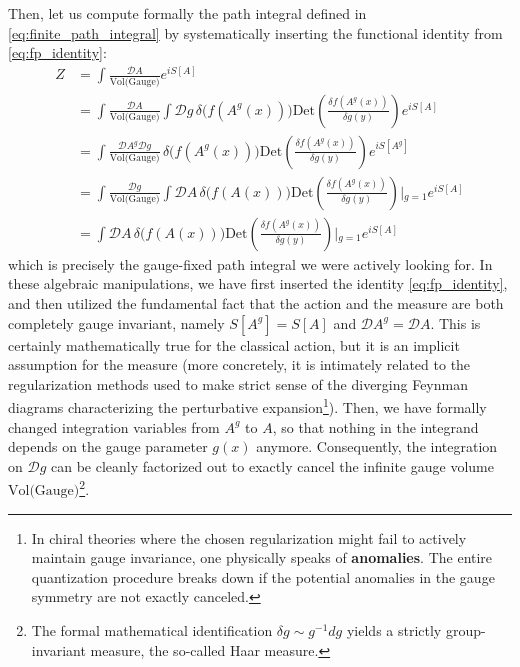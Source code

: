 Then, let us compute formally the path integral defined in \eqref{eq:finite_path_integral} by systematically inserting the functional identity from \eqref{eq:fp_identity}:
\[
    \begin{aligned}
        Z & = \int \frac{\mathcal{D}A}{\text{Vol(Gauge)}} e^{iS[A]} \\ &= \int \frac{\mathcal{D}A}{\text{Vol(Gauge)}} \int \mathcal{D}g \, \delta\Big(f(A^g(x))\Big) \text{Det} \left( \frac{\delta f(A^g(x))}{\delta g(y)} \right) e^{iS[A]} \\ &= \int \frac{\mathcal{D}A^g \mathcal{D}g}{\text{Vol(Gauge)}} \, \delta\Big(f(A^g(x))\Big) \text{Det} \left( \frac{\delta f(A^g(x))}{\delta g(y)} \right) e^{iS[A^g]} \\ &= \int \frac{\mathcal{D}g}{\text{Vol(Gauge)}} \int \mathcal{D}A \, \delta\Big(f(A(x))\Big) \text{Det} \left( \frac{\delta f(A^g(x))}{\delta g(y)} \right)\Bigg\vert{}_{g=1} e^{iS[A]} \\ &= \int \mathcal{D}A \, \delta\Big(f(A(x))\Big) \text{Det} \left( \frac{\delta f(A^g(x))}{\delta g(y)} \right)\Bigg\vert{}_{g=1} e^{iS[A]}
    \end{aligned}
\]
which is precisely the gauge-fixed path integral we were actively looking for. In these algebraic manipulations, we have first inserted the identity \eqref{eq:fp_identity}, and then utilized the fundamental fact that the action and the measure are both completely gauge invariant, namely \(S[A^g] = S[A]\) and \(\mathcal{D}A^g = \mathcal{D}A\). This is certainly mathematically true for the classical action, but it is an implicit assumption for the measure (more concretely, it is intimately related to the regularization methods used to make strict sense of the diverging Feynman diagrams characterizing the perturbative expansion\footnote{In chiral theories where the chosen regularization might fail to actively maintain gauge invariance, one physically speaks of \textbf{anomalies}. The entire quantization procedure breaks down if the potential anomalies in the gauge symmetry are not exactly canceled.}). Then, we have formally changed integration variables from \(A^g\) to \(A\), so that nothing in the integrand depends on the gauge parameter \(g(x)\) anymore. Consequently, the integration on \(\mathcal{D}g\) can be cleanly factorized out to exactly cancel the infinite gauge volume \(\text{Vol(Gauge)}\)\footnote{The formal mathematical identification \(\delta g \sim g^{-1} dg\) yields a strictly group-invariant measure, the so-called Haar measure.}.

